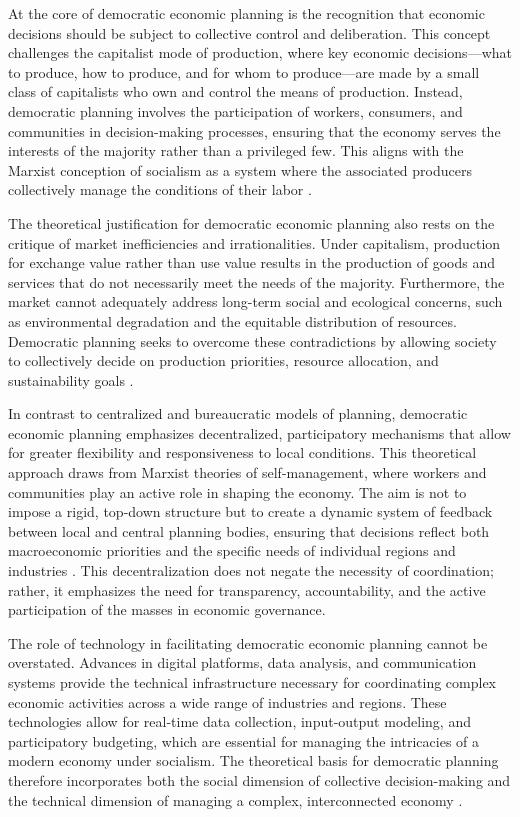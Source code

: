 \begin{refsection}
At the core of democratic economic planning is the recognition that economic decisions should be subject to collective control and deliberation. This concept challenges the capitalist mode of production, where key economic decisions—what to produce, how to produce, and for whom to produce—are made by a small class of capitalists who own and control the means of production. Instead, democratic planning involves the participation of workers, consumers, and communities in decision-making processes, ensuring that the economy serves the interests of the majority rather than a privileged few. This aligns with the Marxist conception of socialism as a system where the associated producers collectively manage the conditions of their labor \cite[pp.~571]{marx1867capital}.

The theoretical justification for democratic economic planning also rests on the critique of market inefficiencies and irrationalities. Under capitalism, production for exchange value rather than use value results in the production of goods and services that do not necessarily meet the needs of the majority. Furthermore, the market cannot adequately address long-term social and ecological concerns, such as environmental degradation and the equitable distribution of resources. Democratic planning seeks to overcome these contradictions by allowing society to collectively decide on production priorities, resource allocation, and sustainability goals \cite[pp.~131]{miliband1977socialism}.

In contrast to centralized and bureaucratic models of planning, democratic economic planning emphasizes decentralized, participatory mechanisms that allow for greater flexibility and responsiveness to local conditions. This theoretical approach draws from Marxist theories of self-management, where workers and communities play an active role in shaping the economy. The aim is not to impose a rigid, top-down structure but to create a dynamic system of feedback between local and central planning bodies, ensuring that decisions reflect both macroeconomic priorities and the specific needs of individual regions and industries \cite[pp.~203]{lenin1917state}. This decentralization does not negate the necessity of coordination; rather, it emphasizes the need for transparency, accountability, and the active participation of the masses in economic governance.

The role of technology in facilitating democratic economic planning cannot be overstated. Advances in digital platforms, data analysis, and communication systems provide the technical infrastructure necessary for coordinating complex economic activities across a wide range of industries and regions. These technologies allow for real-time data collection, input-output modeling, and participatory budgeting, which are essential for managing the intricacies of a modern economy under socialism. The theoretical basis for democratic planning therefore incorporates both the social dimension of collective decision-making and the technical dimension of managing a complex, interconnected economy \cite[pp.~81]{cockshott1993towards}.


\end{refsection}
